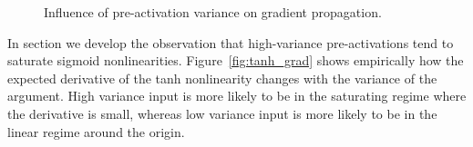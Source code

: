 \documentclass{article} %
\begin{document}

\begin{figure}
  \center%
  \hspace{2mm}%
  \caption{
Influence of pre-activation variance on gradient propagation.
}
  \label{figure:DCNtradeoff}
\end{figure}

In section we develop the observation that high-variance pre-activations tend to saturate sigmoid nonlinearities.
Figure~\ref{fig:tanh_grad} shows empirically how the expected derivative of the tanh nonlinearity changes with the variance of the argument.
High variance input is more likely to be in the saturating regime where the derivative is small,
whereas low variance input is more likely to be in the linear regime around the origin.
\end{document}
